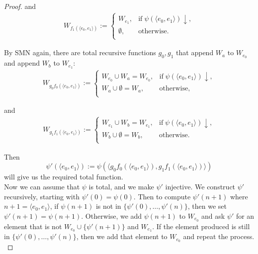 \documentclass{article}
\begin{document}
\begin{enumerate}[label={\bf Q\arabic*:}]
\begin{enumerate}[label={(\roman*)}]
\begin{proof}
          and
          \begin{align*}
            W_{f_1(\langle e_0,e_1\rangle)} :=
            \begin{cases}
              W_{e_1}, &\text{if}\; \psi(\langle e_0,e_1\rangle)\downarrow,\\
              \emptyset, &\text{otherwise}.\\
            \end{cases}
          \end{align*}

          By SMN again, there are total recursive functions $g_0,g_1$ that
          append $W_a$ to $W_{e_0}$ and append $W_b$ to $W_{e_1}$:
          \begin{align*}
            W_{g_0f_0(\langle e_0,e_1\rangle)} :=
            \begin{cases}
              W_{e_0}\cup W_a=W_{e_0}, &\text{if}\; \psi(\langle
                e_0,e_1\rangle)\downarrow,\\
              W_a\cup\emptyset =W_a, &\text{otherwise},\\
            \end{cases}
          \end{align*}

          and
          \begin{align*}
            W_{g_1f_1(\langle e_0,e_1\rangle)} :=
            \begin{cases}
              W_{e_1}\cup W_b=W_{e_1}, &\text{if}\; \psi(\langle
                e_0,e_1\rangle)\downarrow,\\
              W_b\cup\emptyset =W_b, &\text{otherwise}.\\
            \end{cases}
          \end{align*}

          Then
          \[\psi'(\langle e_0,e_1\rangle) :=\psi(\langle g_0f_0(\langle
            e_0,e_1\rangle), g_1f_1(\langle e_0,e_1\rangle)\rangle)\]
          will give us the required total function. \\

          Now we can assume that $\psi$ is total, and we make $\psi'$
          injective. We construct $\psi'$ recursively, starting with
          $\psi'(0)=\psi(0)$. Then to compute $\psi'(n+1)$ where
          $n+1=\langle e_0,e_1\rangle$, if $\psi(n+1)$ is not in
          $\{\psi'(0),\ldots,\psi'(n)\}$, then we set
          $\psi'(n+1)=\psi(n+1)$. Otherwise, we add $\psi(n+1)$ to
          $W_{e_0}$ and ask $\psi'$ for an element that is not
          $W_{e_0}\cup\{\psi'(n+1)\}$ and $W_{e_1}$. If the element
          produced is still in $\{\psi'(0),\ldots,\psi'(n)\}$, then we add
          that element to $W_{e_0}$ and repeat the process. \\


\end{proof}
\end{enumerate}
\end{enumerate}
\end{document}

